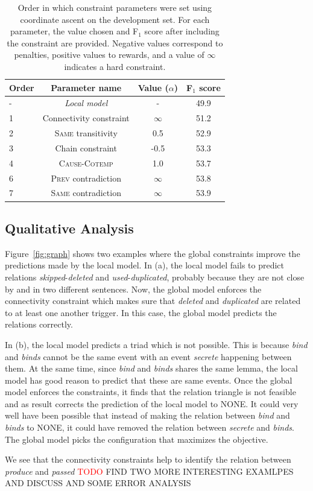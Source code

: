 
\begin{table}[t]
{\footnotesize
\begin{tabular}{| l | c | c | c |}
\hline
    \textbf{Order} & \textbf{Parameter name} & \textbf{Value} ($\alpha$)& \textbf{F$_1$ score} \\
\hline
\hline
- & \emph{Local model} & - & 49.9 \\
1 & Connectivity constraint & $\infty$ & 51.2 \\
2 & \textsc{Same} transitivity &  0.5 & 52.9 \\
3 & Chain constraint & -0.5 & 53.3\\
4 & \textsc{Cause}-\textsc{Cotemp} & 1.0 & 53.7\\
6 & \textsc{Prev} contradiction & $\infty$ & 53.8\\
7 & \textsc{Same} contradiction & $\infty$ & 53.9\\

\hline
\end{tabular}}
\caption{Order in which constraint parameters were set using coordinate ascent on the development set. For each parameter, the value chosen and F$_1$ score after including the constraint are provided. Negative values correspond to penalties, positive values to rewards, and a value of $\infty$ indicates a hard constraint.}
\label{tab:paramtuning}
\end{table}

\subsection{Qualitative Analysis} \label{subsec:analysis}

Figure~\ref{fig:graph} shows two examples where the global constraints improve the predictions made by the local model. In (a), the local model fails to predict relations \emph{skipped}-\emph{deleted} and \emph{used}-\emph{duplicated}, probably because they are not close by and in two different sentences. Now, the global model enforces the connectivity constraint which makes sure that \emph{deleted} and \emph{duplicated} are related to at least one another trigger. In this case, the global model predicts the relations correctly.

In (b), the local model predicts a triad which is not possible. This is because \emph{bind} and \emph{binds} cannot be the same event with an event \emph{secrete} happening between them. At the same time, since \emph{bind} and \emph{binds} shares the same lemma, the local model has good reason to predict that these are same events. Once the global model enforces the constraints, it finds that the relation triangle is not feasible and as result corrects the prediction of the local model to NONE. It could very well have been possible that instead of making the relation between \emph{bind} and \emph{binds} to NONE, it could have removed the relation between \emph{secrete} and \emph{binds}. The global model picks the configuration that maximizes the objective.

We see that the connectivity constraints help to identify the relation between \emph{produce} and \emph{passed} \textcolor{red}{TODO} FIND TWO MORE INTERESTING EXAMLPES AND DISCUSS AND SOME ERROR ANALYSIS
